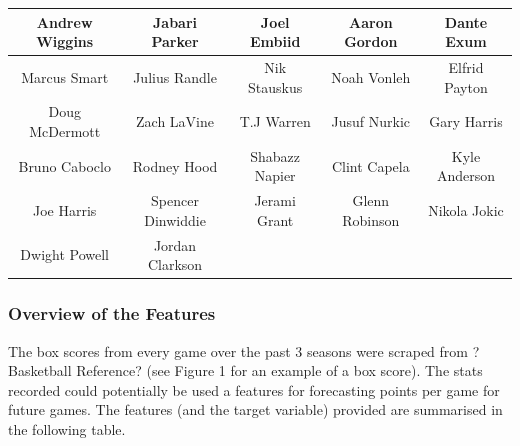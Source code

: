 \documentclass[a4paper,11pt,twoside]{article}
\begin{document}
\vspace{5mm}
\begin{center}
\begin{tabular}{ ccccc } 
 \hline
Andrew Wiggins & Jabari Parker & Joel Embiid & Aaron  Gordon& Dante Exum \\ 
 \hline
Marcus Smart & Julius Randle & Nik Stauskus & Noah Vonleh & Elfrid Payton \\ 
 \hline
 Doug McDermott & Zach LaVine & T.J Warren & Jusuf Nurkic & Gary Harris\\
 \hline
 Bruno Caboclo & Rodney Hood & Shabazz Napier & Clint Capela & Kyle Anderson\\
 \hline 
 Joe Harris & Spencer Dinwiddie & Jerami Grant & Glenn Robinson & Nikola Jokic\\
 \hline
  Dwight Powell & Jordan Clarkson\\
\hline
\end{tabular}
\end{center}

 \subsubsection{Overview of the Features}
The box scores from every game over the past 3 seasons  were scraped from ?Basketball Reference? (see Figure 1 for an example of a box score). The stats recorded could potentially be used a features for forecasting points per game for future games. The features (and the target variable) provided are summarised in the following table. 
\end{document}

